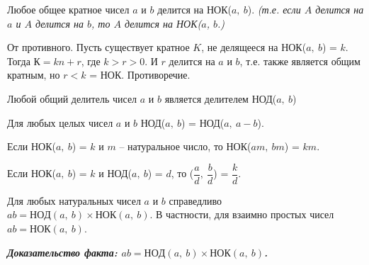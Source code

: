 \begin{state} \label{10.8 state2}
    Любое общее кратное чисел $a$ и $b$ делится на НОК($a,~b$). \textit{(т.е. если $A$ делится на $a$ и $A$ делится на $b$, то $A$ делится на НОК($a$, $b$.)}
\end{state}

\begin{dok}
    От противного. Пусть существует кратное $K$, не делящееся на НОК($a,~b$) = $k$. Тогда $К = kn + r$, где $k > r > 0$. И $r$ делится на $a$ и $b$, т.е. также является общим кратным, но $r < k$ = НОК. Противоречие. 
\end{dok}

\begin{state}
    Любой общий делитель чисел $a$ и $b$ является делителем НОД($a,~b$)
\end{state}

\begin{state}
    Для любых целых чисел $a$ и $b$ НОД($a,~b$) = НОД($a,~a - b$).\footnotemark 
\end{state}

\begin{state}
    Если НОК($a,~b$) = $k$ и $m$ -- натуральное число, то НОК($am,~bm$) = $km$.
\end{state}

\begin{state}
    Если НОК($a,~b$) = $k$ и НОД($a,~b$) = $d$, то ($\dfrac{a}{d},~\dfrac{b}{d}$) = $\dfrac{k}{d}$.
\end{state}

\begin{state}
    Для любых натуральных чисел $a$ и $b$ справедливо $ab = НОД(a,~b) \times НОК(a,~b)$. В частности, для взаимно простых чисел $ab = НОК(a,~b)$.
\end{state}

\textbf{\textit{Доказательство факта: $ab = НОД(a,~b) \times НОК(a,~b)$.}}

